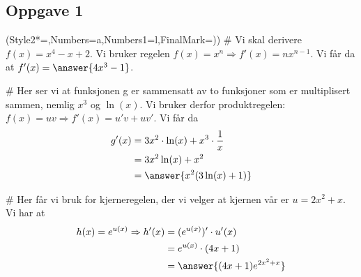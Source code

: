 \subsection*{Oppgave 1}
\begin{easylist}[enumerate]
	\ListProperties(Style2*=,Numbers=a,Numbers1=l,FinalMark={)})
	# Vi skal derivere $f(x) = x^4 - x +2$. Vi bruker regelen $f(x) = x^n \Rightarrow f'(x) = nx^{n-1}$. Vi får da at $f'(x) = \answer{4x^3 - 1}$.
	
	# Her ser vi at funksjonen g er sammensatt av to funksjoner som er multiplisert sammen, nemlig $x^3$ og $\ln(x)$. Vi bruker derfor produktregelen: $f(x) = uv \Rightarrow f'(x) = u'v + uv'$. Vi får da 
	\begin{equation*}
		\begin{aligned}
			g'(x) &= 3x^2 \cdot \ln(x) + x^3 \cdot \frac{1}{x}\\
					&= 3x^2\ln(x) + x^2\\
					&= \answer{x^2(3\ln(x)+1)}\\
		\end{aligned}
	\end{equation*}
	
	# Her får vi bruk for kjerneregelen, der vi velger at kjernen vår er $u = 2x^2 + x$. Vi har at 
	\begin{equation*}
		\begin{aligned}
				h(x) = e^{u(x)} \Rightarrow h'(x) &= (e^{u(x)})' \cdot u'(x) \\
																  &= e^{u(x)} \cdot (4x + 1) \\
																  &= \answer{(4x +1)e^{2x^2 + x}}
		\end{aligned}
	\end{equation*}
\end{easylist}


